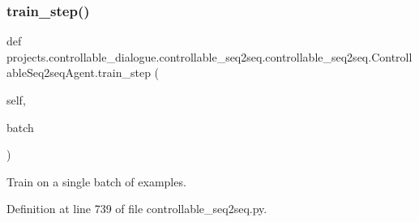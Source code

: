 \subsubsection{\texorpdfstring{train\+\_\+step()}{train\_step()}}
{\footnotesize\ttfamily def projects.\+controllable\+\_\+dialogue.\+controllable\+\_\+seq2seq.\+controllable\+\_\+seq2seq.\+Controllable\+Seq2seq\+Agent.\+train\+\_\+step (\begin{DoxyParamCaption}\item[{}]{self,  }\item[{}]{batch }\end{DoxyParamCaption})}

\begin{DoxyVerb}Train on a single batch of examples.
\end{DoxyVerb}
 

Definition at line 739 of file controllable\+\_\+seq2seq.\+py.


